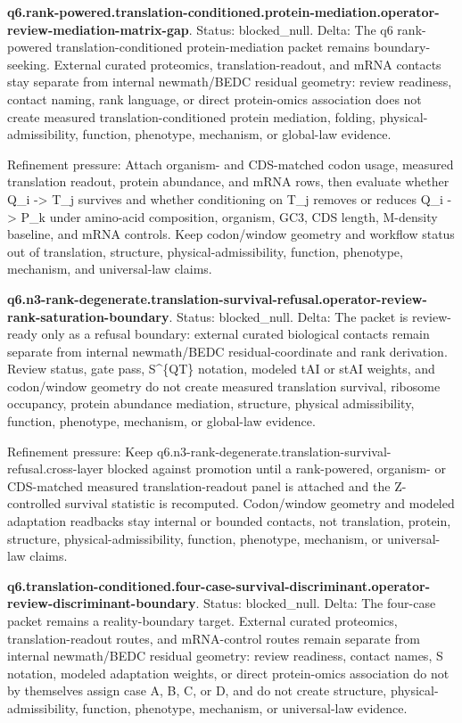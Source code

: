 \textbf{q6.rank-powered.translation-conditioned.protein-mediation.operator-review-mediation-matrix-gap}. Status: blocked\_null. Delta: The q6 rank-powered translation-conditioned protein-mediation packet remains boundary-seeking. External curated proteomics, translation-readout, and mRNA contacts stay separate from internal newmath/BEDC residual geometry: review readiness, contact naming, rank language, or direct protein-omics association does not create measured translation-conditioned protein mediation, folding, physical-admissibility, function, phenotype, mechanism, or global-law evidence.

Refinement pressure: Attach organism- and CDS-matched codon usage, measured translation readout, protein abundance, and mRNA rows, then evaluate whether Q\_i -> T\_j survives and whether conditioning on T\_j removes or reduces Q\_i -> P\_k under amino-acid composition, organism, GC3, CDS length, M-density baseline, and mRNA controls. Keep codon/window geometry and workflow status out of translation, structure, physical-admissibility, function, phenotype, mechanism, and universal-law claims.

\textbf{q6.n3-rank-degenerate.translation-survival-refusal.operator-review-rank-saturation-boundary}. Status: blocked\_null. Delta: The packet is review-ready only as a refusal boundary: external curated biological contacts remain separate from internal newmath/BEDC residual-coordinate and rank derivation. Review status, gate pass, S\textasciicircum{}\{QT\} notation, modeled tAI or stAI weights, and codon/window geometry do not create measured translation survival, ribosome occupancy, protein abundance mediation, structure, physical admissibility, function, phenotype, mechanism, or global-law evidence.

Refinement pressure: Keep q6.n3-rank-degenerate.translation-survival-refusal.cross-layer blocked against promotion until a rank-powered, organism- or CDS-matched measured translation-readout panel is attached and the Z-controlled survival statistic is recomputed. Codon/window geometry and modeled adaptation readbacks stay internal or bounded contacts, not translation, protein, structure, physical-admissibility, function, phenotype, mechanism, or universal-law claims.

\textbf{q6.translation-conditioned.four-case-survival-discriminant.operator-review-discriminant-boundary}. Status: blocked\_null. Delta: The four-case packet remains a reality-boundary target. External curated proteomics, translation-readout routes, and mRNA-control routes remain separate from internal newmath/BEDC residual geometry: review readiness, contact names, S notation, modeled adaptation weights, or direct protein-omics association do not by themselves assign case A, B, C, or D, and do not create structure, physical-admissibility, function, phenotype, mechanism, or universal-law evidence.

